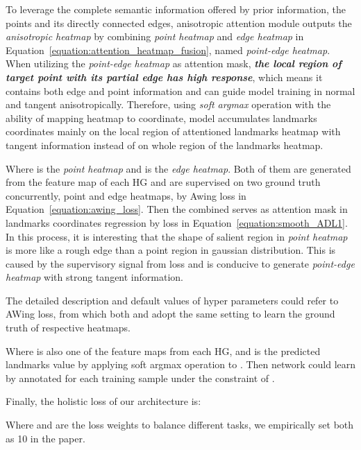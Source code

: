\documentclass[10pt,twocolumn,letterpaper]{article}
\begin{document}
To leverage the complete semantic information offered by prior information, the points and its directly connected edges, anisotropic attention module outputs the \emph{anisotropic heatmap} by combining \emph{point heatmap} and \emph{edge heatmap} in Equation~\ref{equation:attention_heatmap_fusion}, named \emph{point-edge heatmap}. When utilizing the \emph{point-edge heatmap} as attention mask, \textbf{\emph{the local region of target point with its partial edge has high response}}, which means it contains both edge and point information and can guide model training in normal and tangent anisotropically.
Therefore, using \emph{soft argmax} operation with the ability of mapping heatmap to coordinate, model accumulates landmarks coordinates mainly on the local region of attentioned landmarks heatmap with tangent information instead of on whole region of the landmarks heatmap.



Where \emph{} is the \emph{point heatmap} and \emph{} is the \emph{edge heatmap}. Both of them are generated from the feature map of each HG and are supervised on two ground truth concurrently, point and edge heatmaps, by Awing \cite{wang2019adaptive} loss in Equation~\ref{equation:awing_loss}. Then the combined  serves as attention mask in landmarks coordinates regression by  loss in Equation~\ref{equation:smooth_ADL1}. In this process, it is interesting that the shape of salient region in \emph{point heatmap } is more like a rough edge than a point region in gaussian distribution. This is caused by the supervisory signal from  loss and is conducive to generate \emph{point-edge heatmap} with strong tangent information. 



The detailed description and default values of hyper parameters could refer to AWing \cite{wang2019adaptive} loss, from which both \emph{} and \emph{} adopt the same setting to learn the ground truth of respective heatmaps.



Where \emph{} is also one of the feature maps from each HG, and \emph{} is the predicted landmarks value by applying soft argmax operation to \emph{}. Then network could learn \emph{} by annotated  for each training sample under the constraint of .

Finally, the holistic loss of our architecture is:



Where \emph{} and \emph{} are the loss weights to balance different tasks, we empirically set both as 10 in the paper.
\end{document}
